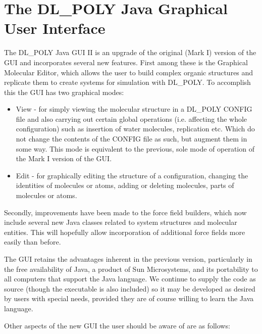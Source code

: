 \section{The DL\_POLY Java Graphical User Interface}
\label{javagui} The DL\_POLY Java GUI II is an upgrade of the
original (Mark I) version of the GUI and incorporates several new features.
First among these is the Graphical Molecular Editor, which allows the user to
build complex organic structures and replicate them to create systems for
simulation with DL\_POLY. To accomplish this the GUI has two graphical modes:

\begin{itemize}
\item View - for simply viewing the molecular structure in a DL\_POLY CONFIG
  file and also carrying out certain global operations (i.e. affecting the
  whole configuration) such as insertion of water molecules, replication etc.
  Which do not change the contents of the CONFIG file as such, but augment
  them in some way. This mode is equivalent to the previous, sole mode of
  operation of the Mark I version of the GUI.  
\item Edit - for graphically editing the structure of a configuration,
  changing the identities of molecules or atoms, adding or deleting molecules,
  parts of molecules or atoms.
\end{itemize}
Secondly, improvements have been made to the force field builders, which now
include several new Java classes related to system structures and molecular
entities. This will hopefully allow incorporation of additional force fields
more easily than before.

The GUI retains the advantages inherent in the previous version, particularly
in the free availability of Java, a product of Sun Microsystems, and its
portability to all computers that support the Java language. We continue to
supply the code as source (though the executable is also included) so it may
be developed as desired by users with special needs, provided they are of
course willing to learn the Java language.

Other aspects of the new GUI the user should be aware of are as follows:


